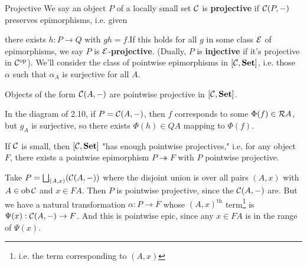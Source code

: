 \documentclass{article}
\begin{document}
\begin{fancydefine}{Projective}
    We say an object $P$ of a locally small set $\mathcal{C}$ is \textbf{projective} if $\mathcal{C}(P, - )$ preserves epimorphisms, i.e. given
    \begin{center}

\end{center}
there exists $h : P \to Q$ with $gh=f$.\gap If this holds for all $g$ in some class $\mathcal{E}$ of epimorphisms, we say $P$ is $\mathcal{E}$-\textbf{projective}. (Dually, $P$ is \textbf{injective} if it's projective in $\mathcal{C}^{\text{op}}$).
We'll consider the class of pointwise epimorphisms in $[\mathcal{C}, \textbf{Set}]$, i.e. those $\alpha$ such that $\alpha_{A}$ is surjective for all $A$.
\end{fancydefine}
\begin{corr}{}
    Objects of the form $\mathcal{C}(A, - )$ are pointwise projective in $[\mathcal{C}, \textbf{Set}]$.
\end{corr}
\proof In the diagram of 2.10, if $P=\mathcal{C}(A,-)$, then $f$ corresponds to some $\Phi(f) \in \mathcal{R} A$, but $g_{A}$ is surjective, so there exists $\Phi(h) \in QA$ mapping to $\Phi(f)$. \endproof
\begin{fancyprop}{}
    If $\mathcal{C}$ is small, then $[\mathcal{C}, \textbf{Set}]$ "has enough pointwise projectives," i.e. for any object $F$, there exists a pointwise epimorphism $P \twoheadrightarrow F$ with $P$ pointwise projective.
\end{fancyprop}
\proof Take $P= \bigsqcup_{(A,x)}(\mathcal{C}(A,-))$ where the disjoint union is over all pairs $(A,x)$ with $A \in \operatorname{ob} \mathcal{C}$ and $x \in FA.$ Then $P$ is pointwise projective, since the $\mathcal{C}(A,-)$ are. \gap But we have a natural transformation $\alpha : P \to F$ whose $(A,x)^{\text{th}}$ term\footnote{i.e. the term corresponding to $(A,x)$} is $\Psi(x) : \mathcal{C}(A, - ) \to F$. And this is pointwise epic, since any $x \in FA$ is in the range of $\Psi(x)$. \endproof
\end{document}
